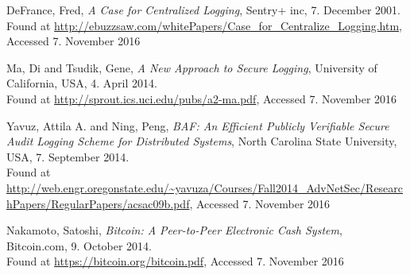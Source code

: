 
\begin{thebibliography}{9}

  DeFrance, Fred,
  \emph{A Case for Centralized Logging},
  Sentry+ inc,
  7. December 2001.\\
  Found at
  \url{http://ebuzzsaw.com/whitePapers/Case_for_Centralize_Logging.htm},
  Accessed 7. November 2016

  Ma, Di and Tsudik, Gene,
  \emph{A New Approach to Secure Logging},
  University of California, USA,
  4. April 2014.\\
  Found at
  \url{http://sprout.ics.uci.edu/pubs/a2-ma.pdf},
  Accessed 7. November 2016

  Yavuz, Attila A. and Ning, Peng,
  \emph{BAF: An Efficient Publicly Verifiable Secure Audit
  Logging Scheme for Distributed Systems},
  North Carolina State University, USA,
  7. September 2014.\\
  Found at
  \url{http://web.engr.oregonstate.edu/~yavuza/Courses/Fall2014_AdvNetSec/ResearchPapers/RegularPapers/acsac09b.pdf},
  Accessed 7. November 2016

  Nakamoto, Satoshi,
  \emph{Bitcoin: A Peer-to-Peer Electronic Cash System},
  Bitcoin.com,
  9. October 2014.\\
  Found at
  \url{https://bitcoin.org/bitcoin.pdf},
  Accessed 7. November 2016

\end{thebibliography}

